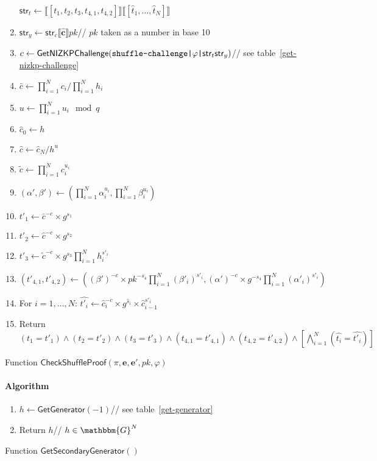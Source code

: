 \documentclass[a4paper]{article}
\newcommand{\G}{\mathbbm{G}}
\begin{document}
\begin{table}
\begin{framed}
\begin{enumerate}
      $\textsf{str}_t\leftarrow\llbracket[t_1,t_2,t_3,t_{4,1},t_{4,2}]\rrbracket\llbracket[\hat{t}_1,\dots,\hat{t}_N]\rrbracket$
    \item
      $\textsf{str}_y\leftarrow\textsf{str}_c\llbracket\hat{\textbf{c}}\rrbracket
      pk$\hfill// $pk$ taken as a number in base 10
    \item
      $c\leftarrow\textsf{GetNIZKPChallenge}(\verb=shuffle-challenge|=\varphi\verb=|=\textsf{str}_t\textsf{str}_y)$\hfill//
      see table~\ref{get-nizkp-challenge}
    \item $\bar{c}\leftarrow\prod_{i=1}^N c_i/\prod_{i=1}^N h_i$
    \item $u\leftarrow\prod_{i=1}^N u_i\mod q$
    \item $\hat{c}_0\leftarrow h$
    \item $\hat{c}\leftarrow\hat{c}_N/h^u$
    \item $\tilde{c}\leftarrow\prod_{i=1}^N c_i^{u_i}$
    \item $(\alpha',\beta')\leftarrow(\prod_{i=1}^N \alpha_i^{u_i},\prod_{i=1}^N \beta_i^{u_i})$
    \item $t'_1\leftarrow\bar{c}^{-c}\times g^{s_1}$
    \item $t'_2\leftarrow\hat{c}^{-c}\times g^{s_2}$
    \item $t'_3\leftarrow\tilde{c}^{-c}\times g^{s_3}\prod_{i=1}^N h_i^{s'_i}$
    \item
      $(t'_{4,1},t'_{4,2})\leftarrow((\beta')^{-c}\times
      pk^{-s_4}\prod_{i=1}^N(\beta'_i)^{s'_i},(\alpha')^{-c}\times
      g^{-s_4}\prod_{i=1}^N(\alpha'_i)^{s'_i})$
    \item For $i=1,\dots,N$: $\hat{t'_i}\leftarrow\hat{c}_i^{-c}\times g^{\hat{s}_i}\times\hat{c}_{i-1}^{s'_i}$
    \item Return
      $(t_1=t'_1)\land(t_2=t'_2)\land(t_3=t'_3)\land(t_{4,1}=t'_{4,1})\land(t_{4,2}=t'_{4,2})\land\left[\bigwedge_{i=1}^N(\hat{t_i}=\hat{t'_i})\right]$
    \end{enumerate}
  \end{framed}
  \caption{Function $\mathsf{CheckShuffleProof}(\pi,\textbf{e},\textbf{e}',pk,\varphi)$}
  \label{check-shuffle-proof}
\end{table}

\begin{table}
  \begin{framed}
    \noindent\paragraph{Algorithm}
    \begin{enumerate}
    \item $h\leftarrow\textsf{GetGenerator}(-1)$\hfill// see
      table~\ref{get-generator}
    \item Return $h$\hfill// $h\in\G^N$
    \end{enumerate}
  \end{framed}
  \caption{Function $\mathsf{GetSecondaryGenerator}()$}
  \label{get-secondary-generator}
\end{table}
\end{document}
